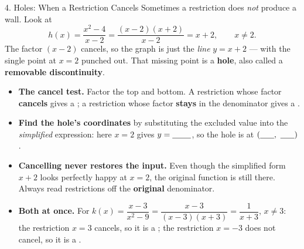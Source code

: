 \documentclass[10pt]{article}
\newcommand{\lgrid}[4]{%
  \draw[step=1, linegray!40, very thin] (#1,#3) grid (#2,#4);
  \draw[->, semithick, charcoal] (#1,0)--(#2,0) node[below right, font=\scriptsize]{$x$};
  \draw[->, semithick, charcoal] (0,#3)--(0,#4) node[left, font=\scriptsize]{$y$};}
\begin{document}
\begin{notesbox}{4. Holes: When a Restriction Cancels}
Sometimes a restriction does \emph{not} produce a wall. Look at
\[
  h(x) = \frac{x^2-4}{x-2} = \frac{(x-2)(x+2)}{x-2} = x+2, \qquad x \neq 2 .
\]
The factor $(x-2)$ cancels, so the graph is just the \emph{line} $y=x+2$ --- with the single point at
$x=2$ punched out. That missing point is a \textbf{hole}, also called a \textbf{removable
discontinuity}.
\begin{center}
\end{center}
\begin{itemize}[leftmargin=1.5em, itemsep=3pt]
  \item \textbf{The cancel test.} Factor the top and bottom. A restriction whose factor
        \textbf{cancels} gives a \blank{1.6cm}; a restriction whose factor \textbf{stays} in the
        denominator gives a \blank{4.6cm}.
  \item \textbf{Find the hole's coordinates} by substituting the excluded value into the
        \emph{simplified} expression: here $x=2$ gives $y=\blank{0.8cm}$, so the hole is at
        $(\blank{0.6cm},\ \blank{0.6cm})$.
  \item \textbf{Cancelling never restores the input.} Even though the simplified form $x+2$ looks
        perfectly happy at $x=2$, the original function is still \blank{3.0cm} there. Always read
        restrictions off the \textbf{original} denominator.
  \item \textbf{Both at once.} For $k(x)=\dfrac{x-3}{x^2-9}=\dfrac{x-3}{(x-3)(x+3)}=\dfrac{1}{x+3}$,
        $x\neq 3$: the restriction $x=3$ cancels, so it is a \blank{1.4cm}; the restriction
        $x=-3$ does not cancel, so it is a \blank{4.0cm}.
\end{itemize}
\end{notesbox}
\end{document}
